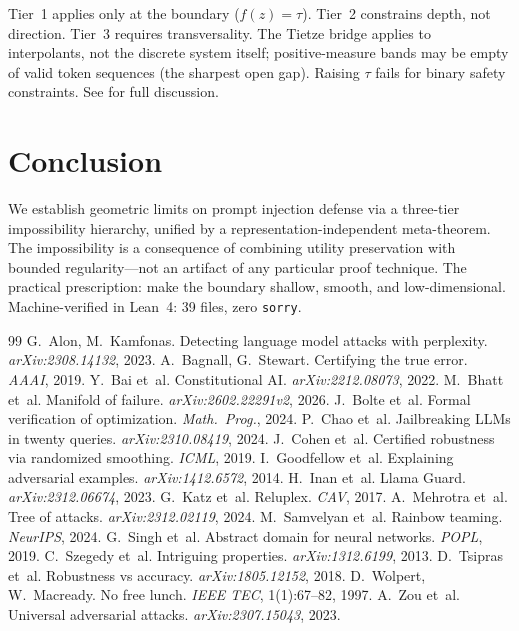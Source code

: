 \documentclass[11pt]{article}
\begin{document}
Tier~1 applies only at the boundary ($f(z) = \tau$). Tier~2 constrains depth, not direction. Tier~3 requires transversality. The Tietze bridge applies to interpolants, not the discrete system itself; positive-measure bands may be empty of valid token sequences (the sharpest open gap). Raising $\tau$ fails for binary safety constraints. See  for full discussion.

\section{Conclusion}

We establish geometric limits on prompt injection defense via a three-tier impossibility hierarchy, unified by a representation-independent meta-theorem. The impossibility is a consequence of combining utility preservation with bounded regularity---not an artifact of any particular proof technique. The practical prescription: make the boundary shallow, smooth, and low-dimensional. Machine-verified in Lean~4: 39 files, zero \texttt{sorry}.



\begin{thebibliography}{99}
 G.~Alon, M.~Kamfonas. Detecting language model attacks with perplexity. \emph{arXiv:2308.14132}, 2023.
 A.~Bagnall, G.~Stewart. Certifying the true error. \emph{AAAI}, 2019.
 Y.~Bai et~al. Constitutional AI. \emph{arXiv:2212.08073}, 2022.
 M.~Bhatt et~al. Manifold of failure. \emph{arXiv:2602.22291v2}, 2026.
 J.~Bolte et~al. Formal verification of optimization. \emph{Math.\ Prog.}, 2024.
 P.~Chao et~al. Jailbreaking LLMs in twenty queries. \emph{arXiv:2310.08419}, 2024.
 J.~Cohen et~al. Certified robustness via randomized smoothing. \emph{ICML}, 2019.
 I.~Goodfellow et~al. Explaining adversarial examples. \emph{arXiv:1412.6572}, 2014.
 H.~Inan et~al. Llama Guard. \emph{arXiv:2312.06674}, 2023.
 G.~Katz et~al. Reluplex. \emph{CAV}, 2017.
 A.~Mehrotra et~al. Tree of attacks. \emph{arXiv:2312.02119}, 2024.
 M.~Samvelyan et~al. Rainbow teaming. \emph{NeurIPS}, 2024.
 G.~Singh et~al. Abstract domain for neural networks. \emph{POPL}, 2019.
 C.~Szegedy et~al. Intriguing properties. \emph{arXiv:1312.6199}, 2013.
 D.~Tsipras et~al. Robustness vs accuracy. \emph{arXiv:1805.12152}, 2018.
 D.~Wolpert, W.~Macready. No free lunch. \emph{IEEE TEC}, 1(1):67--82, 1997.
 A.~Zou et~al. Universal adversarial attacks. \emph{arXiv:2307.15043}, 2023.
\end{thebibliography}
\end{document}
